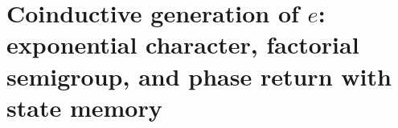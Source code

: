 \chapter{Coinductive generation of \(e\): exponential character, factorial semigroup, and phase return with state memory}
\label{chap:p3-final:29:generacion_e}

